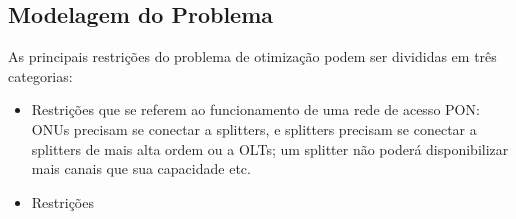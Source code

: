 \documentclass[12pt]{article}
\begin{document}
\subsection{Modelagem do Problema}

As principais restrições do problema de otimização podem ser divididas em três categorias:
\begin{itemize}
\item Restrições que se referem ao funcionamento de uma rede de acesso PON: ONUs precisam se conectar a splitters, e splitters precisam se conectar a splitters de mais alta ordem ou a OLTs; um splitter não poderá disponibilizar mais canais que sua capacidade etc.
\item Restrições
\end{itemize}



\end{document}
